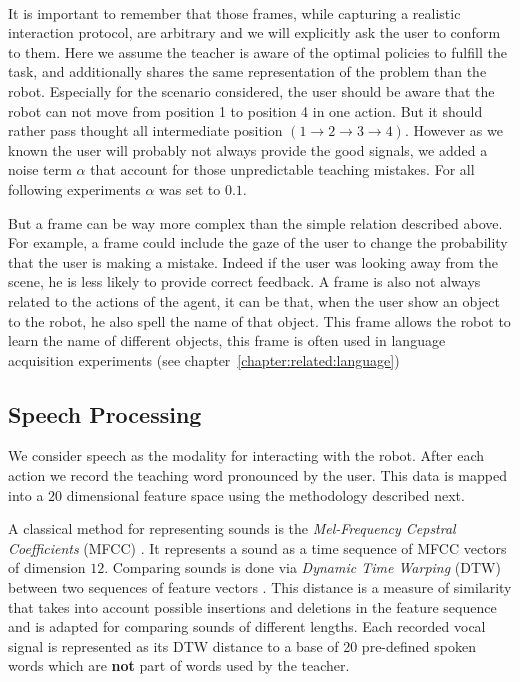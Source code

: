 \paragraph{} It is important to remember that those frames, while capturing a realistic interaction protocol, are arbitrary and we will explicitly ask the user to conform to them. Here we assume the teacher is aware of the optimal policies to fulfill the task, and additionally shares the same representation of the problem than the robot. Especially for the scenario considered, the user should be aware that the robot can not move from position 1 to position 4 in one action. But it should rather pass thought all intermediate position $(1 \rightarrow 2 \rightarrow 3 \rightarrow 4)$. However as we known the user will probably not always provide the good signals, we added a noise term $\alpha$ that account for those unpredictable teaching mistakes. For all following experiments $\alpha$ was set to $0.1$.

But a frame can be way more complex than the simple relation described above. For example, a frame could include the gaze of the user to change the probability that the user is making a mistake. Indeed if the user was looking away from the scene, he is less likely to provide correct feedback. A frame is also not always related to the actions of the agent, it can be that, when the user show an object to the robot, he also spell the name of that object. This frame allows the robot to learn the name of different objects, this frame is often used in language acquisition experiments (see chapter~\ref{chapter:related:language})

\subsection{Speech Processing}

We consider speech as the modality for interacting with the robot. After each action we record the teaching word pronounced by the user. This data is mapped into a $20$ dimensional feature space using the methodology described next.  

A classical method for representing sounds is the \textit{Mel-Frequency Cepstral Coefficients} (MFCC) \cite{zheng2001comparison}. It represents a sound as a time sequence of MFCC vectors of dimension $12$. Comparing sounds is done via \textit{Dynamic Time Warping} (DTW) between two sequences of feature vectors \cite{sakoe1978dynamic}. This distance is a measure of similarity that takes into account possible insertions and deletions in the feature sequence and is adapted for comparing sounds of different lengths. Each recorded vocal signal is represented as its DTW distance to a base of 20 pre-defined spoken words which are \textbf{not} part of words used by the teacher.

